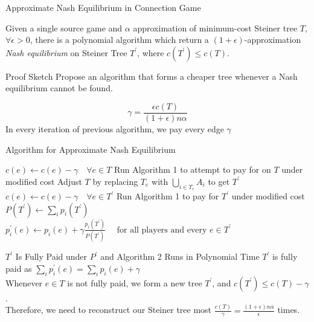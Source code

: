 \documentclass[11pt,aspectratio=169]{beamer}
\begin{document}
\begin{frame}{Approximate Nash Equilibrium in Connection Game}
    \begin{theorem}
        Given a single source game and \(\alpha\) approximation of minimum-cost Steiner tree \(T\), \(\forall \epsilon > 0\), there is a polynomial algorithm which return a \((1+\epsilon)\)-approximation \textit{Nash equilibrium} on Steiner Tree \(T^{'}\), where $c(T^{'}) \leq c(T)$.
    \end{theorem}
\end{frame}

\begin{frame}{Proof Sketch}
    Propose an algorithm that forms a cheaper tree whenever a Nash equilibrium cannot be found.

    \begin{equation*}
        \gamma = \frac{\epsilon c(T)}{(1+\epsilon)n\alpha}
    \end{equation*}
    In every iteration of previous algorithm, we pay every edge $\gamma$\\
\end{frame}

\begin{frame}{Algorithm for Approximate Nash Equilibrium}
    \begin{algorithm}[H]
        \begin{algorithmic}[2]
            \STATE $c(e) \gets  c(e) -\gamma \quad \forall e \in T$
            \STATE Run Algorithm 1 to attempt to pay for on $T$ under modified cost
            \STATE  Adjust \( T\) by replacing \(T_e\) with  \(\bigcup_{i\in T_e} A_i\) to get \(T^{'}\)
            \STATE $c(e) \gets  c(e) -\gamma \quad \forall e \in T^{'}$
            \STATE Run Algorithm 1 to pay for $T^{'}$ under modified cost
            \STATE $P(T^{'}) \gets \sum_i p_i(T^{'})$
            \STATE $p_i^{'}(e) \gets p_i(e) + \gamma\frac{p_i(T^{'})}{P(T^{'})}\quad \text{ for all players and every } e \in T^{'}$
            \ENDIF
            \ENDWHILE
        \end{algorithmic}
        \caption{pseudocode for approximate Nash Equilibrium }
        \end{algorithm}
\end{frame}

\begin{frame}{$T^{'}$ Is Fully Paid under $P^{'}$ and Algorithm 2 Runs in Polynomial Time}
    $T^{'}$ is fully paid as $\sum_i p_i^{'}(e) = \sum_i p_i(e) + \gamma$\\
    Whenever \( e \in T \) is not fully paid, we form a new tree $T^{'}$, and $c(T^{'}) \leq c(T) - \gamma $.\\
    Therefore, we need to reconstruct our Steiner tree most  $\frac{c(T)}{\gamma} = \frac{(1+\epsilon)n\alpha }{\epsilon}$ times.

\end{frame}
\end{document}
